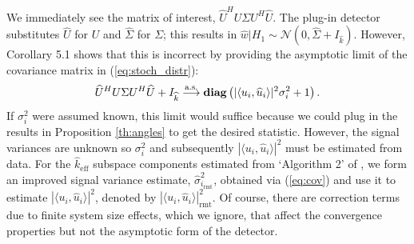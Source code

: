 We immediately see the matrix of interest, $\widehat{U}^HU\Sigma U^H\widehat{U}$. The plug-in detector substitutes $\widehat{U}$ for $U$ and $\widehat{\Sigma}$ for $\Sigma$; this results in $\widehat{w}|H_1\sim\mathcal{N}(0,\widehat{\Sigma} +I_{\widehat{k}})$. However, Corollary 5.1 shows that this is incorrect by providing the asymptotic limit of the covariance matrix in (\ref{eq:stoch_distr}):
\begin{equation}\label{eq:cov mat}
\widehat{U}^HU\Sigma U^H\widehat{U}+I_{\widehat{k}} \convas \diag\left(|\langle u_i,\widehat{u}_i\rangle|^2\sigma_i^2 + 1\right).
\end{equation}
If $\sigma_i^{2}$ were assumed known, this limit would suffice because we could plug in the results in Proposition \ref{th:angles} to get the desired statistic. However, the signal variances are unknown so $\sigma_i^2$ and subsequently $|\langle u_i,\widehat{u}_i\rangle|^2$ must be estimated from data. For the $\widehat{k}_{\text{eff}}$ subspace components estimated from `Algorithm 2' of \cite{nadakuditi2010fundamental}, we form an improved signal variance estimate, $\widehat{\sigma}_{i_\text{rmt}}^2$,  obtained via (\ref{eq:cov}) and use it to estimate $|\langle u_i,\widehat{u}_i\rangle|^2$, denoted by $|\langle u_i,\widehat{u}_i\rangle|^2_\text{rmt}$. Of course, there are correction terms due to finite system size effects, which we ignore, that affect the convergence properties but not the asymptotic form of the detector.

